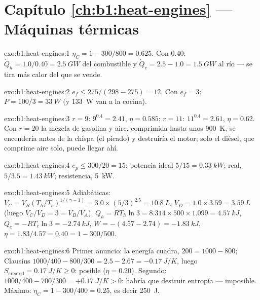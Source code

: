 \section*{Capítulo \ref{ch:b1:heat-engines} --- Máquinas térmicas}

\begin{solution}{exo:b1:heat-engines:1}
$\eta_C = 1 - 300/800 = 0.625$. Con $0.40$: $\dot Q_h = 1.0/0.40 = \qty{2.5}{GW}$
del combustible y $\dot Q_c = 2.5 - 1.0 = \qty{1.5}{GW}$ al río --- se tira
más calor del que se vende.
\end{solution}

\begin{solution}{exo:b1:heat-engines:2}
$e_f \leq 275/(298 - 275) = 12$. Con $e_f = 3$: $P = 100/3 = \qty{33}{W}$
(y \qty{133}{W} van a la cocina).
\end{solution}

\begin{solution}{exo:b1:heat-engines:3}
$r = 9$: $9^{0.4} = 2.41$, $\eta = 0.585$; $r = 11$: $11^{0.4} = 2.61$,
$\eta = 0.62$. Con $r = 20$ la mezcla de gasolina y aire, comprimida hasta unos
\qty{900}{K}, se encendería antes de la chispa (el picado) y destruiría el
motor; solo el diésel, que comprime aire solo, puede llegar ahí.
\end{solution}

\begin{solution}{exo:b1:heat-engines:4}
$e_p \leq 300/20 = 15$: potencia ideal $5/15 = \qty{0.33}{kW}$; real, $5/3.5 =
\qty{1.43}{kW}$; resistencia, \qty{5}{kW}.
\end{solution}

\begin{solution}{exo:b1:heat-engines:5}
Adiabáticas: $V_C = V_B(T_h/T_c)^{1/(\gamma-1)} = 3.0 \times (5/3)^{2.5} =
\qty{10.8}{L}$, $V_D = 1.0 \times 3.59 = \qty{3.59}{L}$ (luego $V_C/V_D = 3 =
V_B/V_A$). $Q_h = RT_h\ln3 = 8.314 \times 500 \times 1.099 = \qty{4.57}{kJ}$,
$Q_c = -RT_c\ln3 = \qty{-2.74}{kJ}$, $W = -(4.57 - 2.74) = \qty{-1.83}{kJ}$,
$\eta = 1.83/4.57 = 0.40 = 1 - 300/500$.
\end{solution}

\begin{solution}{exo:b1:heat-engines:6}
Primer anuncio: la energía cuadra, $200 = 1000 - 800$; Clausius $1000/400 - 800/300
= 2.5 - 2.67 = \qty{-0.17}{J/K}$, luego $S_{\mathrm{created}} = \qty{0.17}{J/K} \geq 0$:
posible ($\eta = 0.20$). Segundo: $1000/400 - 700/300 = +\qty{0.17}{J/K} > 0$:
habría que destruir entropía --- imposible. Máximo: $\eta_C = 1 -
300/400 = 0.25$, es decir \qty{250}{J}.
\end{solution}

